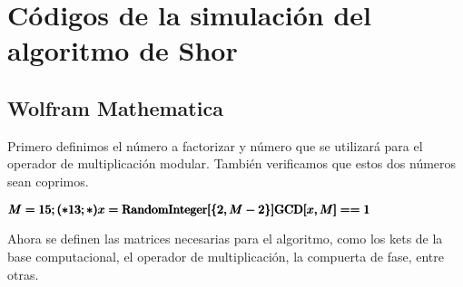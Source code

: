 \chapter{Códigos de la simulación del algoritmo de Shor}
\label{ch:shorcod}

\section{Wolfram Mathematica}

Primero definimos el número a factorizar y número que se utilizará para el operador de multiplicación modular. También verificamos que estos dos números sean coprimos.

\begin{doublespace}
\noindent\(
\pmb{M=15; (*13;*)}\\
\pmb{x=\text{RandomInteger}[\{2,M-2\}]}\\
\pmb{\text{GCD}[x,M]==1}\)
\end{doublespace}

Ahora se definen las matrices necesarias para el algoritmo, como los kets de la base computacional, el operador de multiplicación, la compuerta de fase, entre otras.

